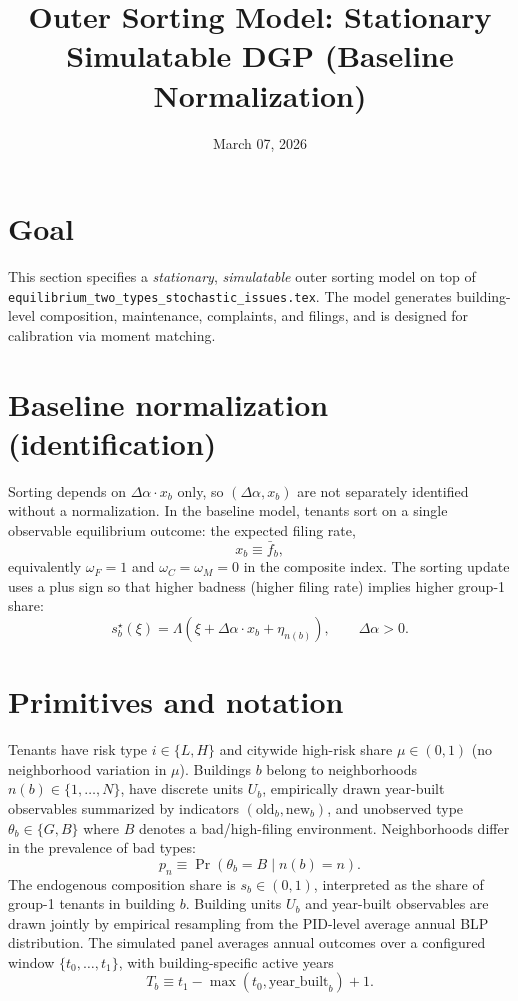 \documentclass[11pt]{article}
\title{Outer Sorting Model: Stationary Simulatable DGP (Baseline Normalization)}
\author{}
\date{March 07, 2026}
\begin{document}
\maketitle

\section{Goal}
This section specifies a \emph{stationary}, \emph{simulatable} outer sorting model on top of \texttt{equilibrium\_two\_types\_stochastic\_issues.tex}. The model generates building-level composition, maintenance, complaints, and filings, and is designed for calibration via moment matching.

\section{Baseline normalization (identification)}
Sorting depends on $\Delta\alpha\cdot x_b$ only, so $(\Delta\alpha,x_b)$ are not separately identified without a normalization. In the baseline model, tenants sort on a single observable equilibrium outcome: the expected filing rate,
\[
x_b \equiv \bar f_b,
\]
equivalently $\omega_F=1$ and $\omega_C=\omega_M=0$ in the composite index. The sorting update uses a plus sign so that higher badness (higher filing rate) implies higher group-1 share:
\[
s_b^\star(\xi)=\Lambda\!\left(\xi + \Delta\alpha\cdot x_b + \eta_{n(b)}\right),\qquad \Delta\alpha>0.
\]

\section{Primitives and notation}
Tenants have risk type $i\in\{L,H\}$ and citywide high-risk share $\mu\in(0,1)$ (no neighborhood variation in $\mu$). Buildings $b$ belong to neighborhoods $n(b)\in\{1,\dots,N\}$, have discrete units $U_b$, empirically drawn year-built observables summarized by indicators $(\mathrm{old}_b,\mathrm{new}_b)$, and unobserved type $\theta_b\in\{G,B\}$ where $B$ denotes a bad/high-filing environment. Neighborhoods differ in the prevalence of bad types:
\[
p_n \equiv \Pr(\theta_b=B\mid n(b)=n).
\]
The endogenous composition share is $s_b\in(0,1)$, interpreted as the share of group-1 tenants in building $b$.
Building units $U_b$ and year-built observables are drawn jointly by empirical resampling from the PID-level average annual BLP distribution. The simulated panel averages annual outcomes over a configured window $\{t_0,\dots,t_1\}$, with building-specific active years
\[
T_b \equiv t_1 - \max(t_0,\mathrm{year\_built}_b) + 1.
\]
\end{document}
